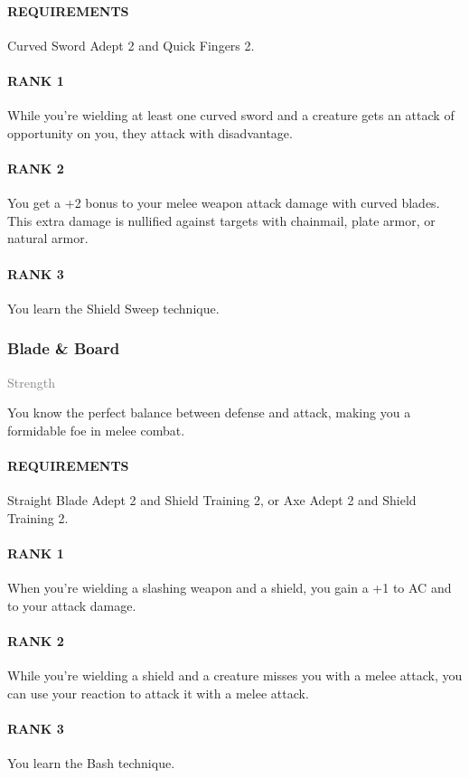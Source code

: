 \paragraph{REQUIREMENTS} Curved Sword Adept 2 and Quick Fingers 2.
\paragraph{RANK 1} While you're wielding at least one curved sword and a creature gets an attack of opportunity on you, they attack with disadvantage.
\paragraph{RANK 2} You get a +2 bonus to your melee weapon attack damage with curved blades.
This extra damage is nullified against targets with chainmail, plate armor, or natural armor.
\paragraph{RANK 3} You learn the Shield Sweep technique.

\subsubsection{Blade \& Board} \label{feat::bladeandboard}
\small{\textcolor{gray}{Strength}}

\normalsize
You know the perfect balance between defense and attack, making you a formidable foe in melee combat.
\paragraph{REQUIREMENTS} Straight Blade Adept 2 and Shield Training 2, or Axe Adept 2 and Shield Training 2.
\paragraph{RANK 1} When you're wielding a slashing weapon and a shield, you gain a +1 to AC and to your attack damage.
\paragraph{RANK 2} While you're wielding a shield and a creature misses you with a melee attack, you can use your reaction to attack it with a melee attack.
\paragraph{RANK 3} You learn the Bash technique.

